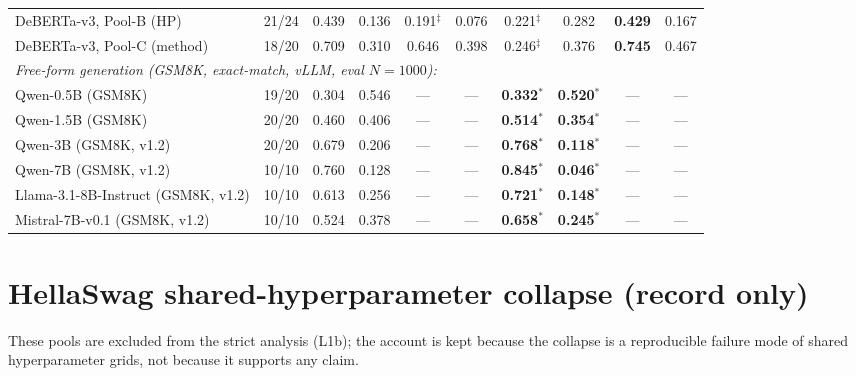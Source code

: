 \documentclass[11pt]{article}
\begin{document}
\begin{table}[t]
\begin{tabular}{ll|cc|cc|cc|cc}
\quad DeBERTa-v3, Pool-B (HP)          & 21/24 & 0.439 & 0.136 & 0.191$^{\ddagger}$ & 0.076 & 0.221$^{\ddagger}$ & 0.282 & \textbf{0.429} & 0.167 \\
\quad DeBERTa-v3, Pool-C (method)      & 18/20 & 0.709 & 0.310 & 0.646 & 0.398 & 0.246$^{\ddagger}$ & 0.376 & \textbf{0.745} & 0.467 \\
\midrule
\multicolumn{10}{l}{\emph{Free-form generation (GSM8K, exact-match, vLLM, eval $N{=}1000$):}} \\
\quad Qwen-0.5B (GSM8K)                & 19/20 & 0.304 & 0.546 & --- & --- & \textbf{0.332}$^{*}$ & \textbf{0.520}$^{*}$ & --- & --- \\
\quad Qwen-1.5B (GSM8K)                & 20/20 & 0.460 & 0.406 & --- & --- & \textbf{0.514}$^{*}$ & \textbf{0.354}$^{*}$ & --- & --- \\
\quad Qwen-3B (GSM8K, v1.2)            & 20/20 & 0.679 & 0.206 & --- & --- & \textbf{0.768}$^{*}$ & \textbf{0.118}$^{*}$ & --- & --- \\
\quad Qwen-7B (GSM8K, v1.2)            & 10/10 & 0.760 & 0.128 & --- & --- & \textbf{0.845}$^{*}$ & \textbf{0.046}$^{*}$ & --- & --- \\
\quad Llama-3.1-8B-Instruct (GSM8K, v1.2) & 10/10 & 0.613 & 0.256 & --- & --- & \textbf{0.721}$^{*}$ & \textbf{0.148}$^{*}$ & --- & --- \\
\quad Mistral-7B-v0.1 (GSM8K, v1.2)     & 10/10 & 0.524 & 0.378 & --- & --- & \textbf{0.658}$^{*}$ & \textbf{0.245}$^{*}$ & --- & --- \\
\bottomrule
\end{tabular}
\end{table}

\section{HellaSwag shared-hyperparameter collapse (record only)}\label{app:hellaswag}
These pools are excluded from the strict analysis (L1b); the account is kept because the collapse is a
reproducible failure mode of shared hyperparameter grids, not because it supports any claim.
\end{document}
